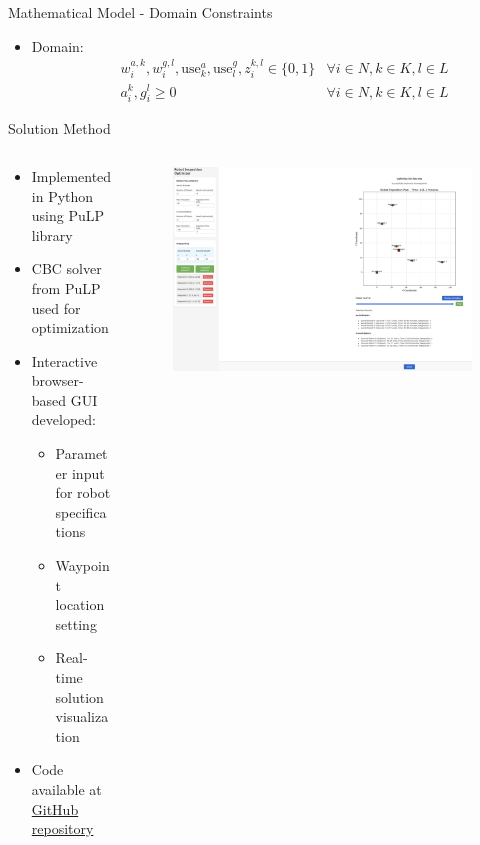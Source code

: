 \documentclass[aspectratio=169,11pt,xcolor={dvipsnames},hyperref={pdftex,pdfpagemode=UseNone,hidelinks,pdfdisplaydoctitle=true},usepdftitle=false]{beamer}
\begin{document}
  \begin{frame}{Mathematical Model - Domain Constraints}
    \begin{itemize}
      \item Domain:
      \begin{align}
        \quad & w_i^{a,k}, w_i^{g,l}, \text{use}_k^a, \text{use}_l^g, z_i^{k,l} \in \{0,1\} & \forall i \in N, k \in K, l \in L \tag{21} \\
        & a_i^k, g_i^l \geq 0 & \forall i \in N, k \in K, l \in L \tag{22}
      \end{align}
    \end{itemize}
    
  \end{frame}
  \begin{frame}{Solution Method}
    \begin{columns}
      \begin{column}{0.58\textwidth}
        \begin{itemize}
          \item Implemented in Python using PuLP library
          \item CBC solver from PuLP used for optimization
          \item Interactive browser-based GUI developed:
            \begin{itemize}
              \item Parameter input for robot specifications
              \item Waypoint location setting
              \item Real-time solution visualization
            \end{itemize}
          \item Code available at \href{https://github.com/jc-cr/multirobot_inspection_optimizer}{GitHub repository}
    \end{itemize}
        
      \end{column}


      \begin{column}{0.42\textwidth}
        \begin{figure}
          \centering
          \includegraphics[scale=0.2]{figures/insp.pdf}
        \end{figure}
        

\end{column}
\end{columns}
\end{frame}
\end{document}
